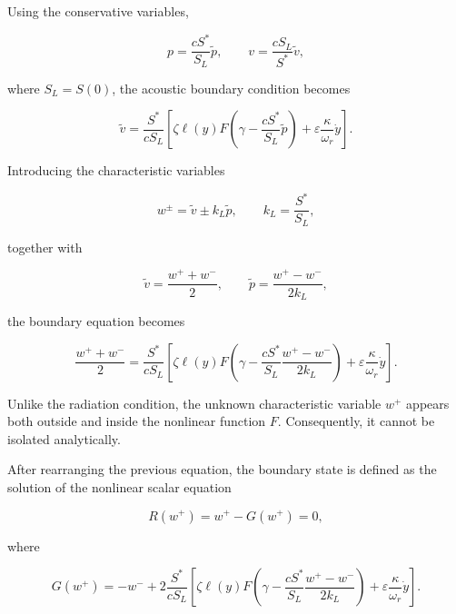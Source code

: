 \documentclass[11pt,a4paper]{report}
\theoremstyle{plain}
\theoremstyle{definition}
\begin{document}
Using the conservative variables,

\begin{equation}
p
=
\dfrac{cS^\ast}{S_L}\tilde p,
\qquad
v
=
\dfrac{cS_L}{S^\ast}\tilde v,
\end{equation}

where $S_L=S(0)$, the acoustic boundary condition becomes

\begin{equation}
\tilde v
=
\dfrac{S^\ast}{cS_L}
\left[
\zeta\ell(y)
F\left(
\gamma
-
\dfrac{cS^\ast}{S_L}\tilde p
\right)
+
\varepsilon
\dfrac{\kappa}{\omega_r}\dot y
\right].
\end{equation}

Introducing the characteristic variables

\begin{equation}
w^\pm
=
\tilde v
\pm
k_L\tilde p,
\qquad
k_L
=
\dfrac{S^\ast}{S_L},
\end{equation}

together with

\begin{equation}
\tilde v
=
\dfrac{w^++w^-}{2},
\qquad
\tilde p
=
\dfrac{w^+-w^-}{2k_L},
\end{equation}

the boundary equation becomes

\begin{equation}
\dfrac{w^++w^-}{2}
=
\dfrac{S^\ast}{cS_L}
\left[
\zeta\ell(y)
F
\left(
\gamma
-
\dfrac{cS^\ast}{S_L}
\dfrac{w^+-w^-}{2k_L}
\right)
+
\varepsilon
\dfrac{\kappa}{\omega_r}\dot y
\right].
\end{equation}

Unlike the radiation condition, the unknown characteristic variable $w^+$
appears both outside and inside the nonlinear function $F$. Consequently, it
cannot be isolated analytically.

After rearranging the previous equation, the boundary state is defined as the
solution of the nonlinear scalar equation

\begin{equation}
\boxed{
R(w^+)
=
w^+
-
G(w^+)
=
0,
}
\label{eq:reed_scalar}
\end{equation}

where

\begin{equation}
G(w^+)
=
-w^-
+
2\dfrac{S^\ast}{cS_L}
\left[
\zeta\ell(y)
F
\left(
\gamma
-
\dfrac{cS^\ast}{S_L}
\dfrac{w^+-w^-}{2k_L}
\right)
+
\varepsilon
\dfrac{\kappa}{\omega_r}\dot y
\right].
\end{equation}
\end{document}
